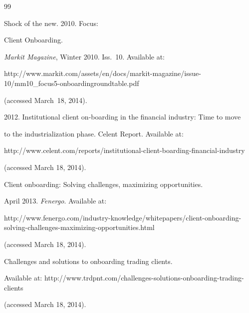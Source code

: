  {\small\frenchspacing


{%




\begin{thebibliography}{99}







Shock of the new. 2010. Focus:


Client Onboarding.


\textit{Markit Magazine}, Winter 2010. Iss.~10.  Available at: {\sf


http://www.markit.com/assets/en/docs/markit-magazine/issue-10/mm10\_focus5-onboardingroundtable.pdf}


(accessed March~18, 2014).









2012. Institutional client on-boarding in the financial industry: Time to move


to the industrialization phase. {Celent Report}. Available at: {\sf


http://www.celent.com/reports/institutional-client-boarding-financial-industry}


(accessed March 18, 2014).







Client onboarding: Solving challenges, maximizing opportunities.


 April 2013. \textit{Fenergo}. Available at: {\sf


http://www.fenergo.com/industry-knowledge/whitepapers/client-onboarding-solving-challenges-maximizing-opportunities.html}


(accessed March 18, 2014).







Challenges and solutions to onboarding trading clients.


Available at: {\sf http://www.trdpnt.com/challenges-solutions-onboarding-trading-clients}


 (accessed March 18, 2014).






\end{thebibliography}}}
